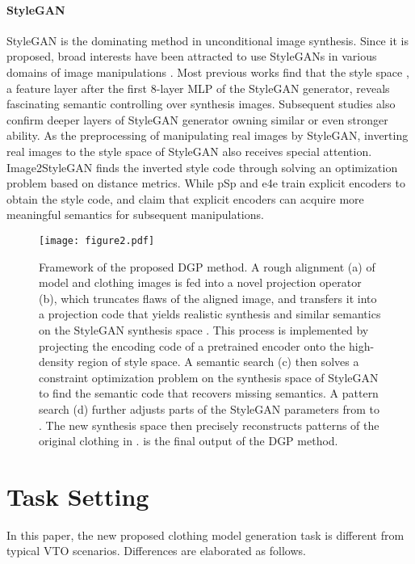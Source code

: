 \documentclass[10pt,twocolumn,letterpaper]{article}
\begin{document}
\paragraph{StyleGAN} StyleGAN \cite{karras2019style,karras2018progressive,karras2020analyzing} is the dominating method in unconditional image synthesis. Since it is proposed, broad interests have been attracted to use StyleGANs in various domains of image manipulations \cite{tewari2020stylerig,wu2021stylespace,shen2020interpreting,yang2020towards}. Most previous works find that the style space \cite{shen2020interpreting,tewari2020stylerig}, a feature layer after the first 8-layer MLP of the StyleGAN generator, reveals fascinating semantic controlling over synthesis images. Subsequent studies \cite{wu2021stylespace,richardson2021encoding} also confirm deeper layers of StyleGAN generator owning similar or even stronger ability. As the preprocessing of manipulating real images by StyleGAN, inverting real images to the style space of StyleGAN also receives special attention. Image2StyleGAN \cite{abdal2019image2stylegan,abdal2020image2stylegan++} finds the inverted style code through solving an optimization problem based on distance metrics. While pSp \cite{richardson2021encoding} and e4e \cite{tov2021designing} train explicit encoders to obtain the style code, and claim that explicit encoders can acquire more meaningful semantics for subsequent manipulations.
\begin{figure*}[ht]
    \centering
    \texttt{[image: figure2.pdf]}\caption{Framework of the proposed DGP method. A rough alignment  (a) of model and clothing images is fed into a novel projection operator (b), which truncates flaws of the aligned image, and transfers it into a projection code  that yields realistic synthesis and similar semantics on the StyleGAN synthesis space . This process is implemented by projecting the encoding code  of a pretrained encoder  onto the high-density region of style space. A semantic search (c) then solves a constraint optimization problem on the synthesis space of StyleGAN to find the semantic code  that recovers missing semantics. A pattern search (d) further adjusts parts of the StyleGAN parameters from  to . The new synthesis space  then precisely reconstructs patterns of the original clothing in .  is the final output of the DGP method.}
    \label{fig:frame}\end{figure*}




\section{Task Setting}\label{sec:task}
In this paper, the new proposed clothing model generation task is different from typical VTO scenarios. Differences are elaborated as follows.
\end{document}
